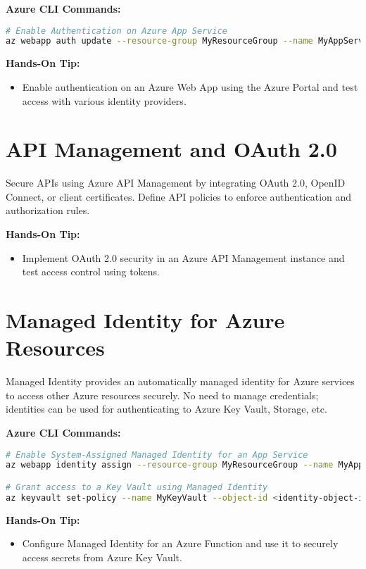 \documentclass{article}
\begin{document}
\textbf{Azure CLI Commands:}
\begin{lstlisting}[language=bash]
# Enable Authentication on Azure App Service
az webapp auth update --resource-group MyResourceGroup --name MyAppService --enabled true --action LoginWithAzureActiveDirectory
\end{lstlisting}

\textbf{Hands-On Tip:}
\begin{itemize}
    \item Enable authentication on an Azure Web App using the Azure Portal and test access with various identity providers.
\end{itemize}

\section{API Management and OAuth 2.0}
Secure APIs using Azure API Management by integrating OAuth 2.0, OpenID Connect, or client certificates. Define API policies to enforce authentication and authorization rules.

\textbf{Hands-On Tip:}
\begin{itemize}
    \item Implement OAuth 2.0 security in an Azure API Management instance and test access control using tokens.
\end{itemize}

\section{Managed Identity for Azure Resources}
Managed Identity provides an automatically managed identity for Azure services to access other Azure resources securely. No need to manage credentials; identities can be used for authenticating to Azure Key Vault, Storage, etc.

\textbf{Azure CLI Commands:}
\begin{lstlisting}[language=bash]
# Enable System-Assigned Managed Identity for an App Service
az webapp identity assign --resource-group MyResourceGroup --name MyAppService

# Grant access to a Key Vault using Managed Identity
az keyvault set-policy --name MyKeyVault --object-id <identity-object-id> --secret-permissions get
\end{lstlisting}

\textbf{Hands-On Tip:}
\begin{itemize}
    \item Configure Managed Identity for an Azure Function and use it to securely access secrets from Azure Key Vault.
\end{itemize}
\end{document}
